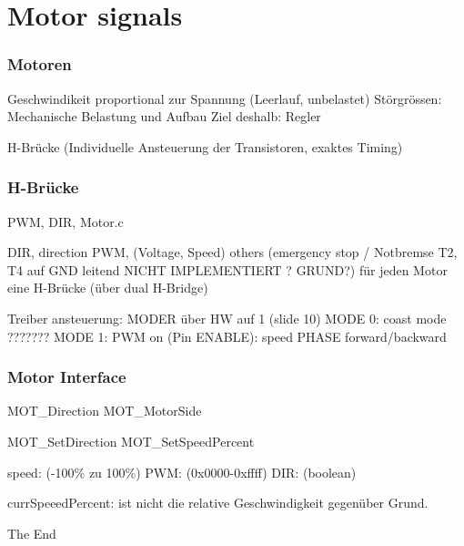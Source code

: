 \documentclass{beamer}
\begin{document}
\section{Motor signals} %
\begin{frame}
	\frametitle{Motoren}
	Geschwindikeit proportional zur Spannung (Leerlauf, unbelastet)
		Störgrössen: Mechanische Belastung und Aufbau
	Ziel deshalb: Regler

	H-Brücke (Individuelle Ansteuerung der Transistoren, exaktes Timing)

	
\end{frame}

\begin{frame}
	\frametitle{H-Brücke}
	PWM, DIR, Motor.c

	DIR, direction
	PWM, (Voltage, Speed)
	others (emergency stop / Notbremse T2, T4 auf GND leitend NICHT IMPLEMENTIERT ? GRUND?)
	für jeden Motor eine H-Brücke (über dual H-Bridge)

	Treiber ansteuerung:
		MODER über HW auf 1 (slide 10)
		MODE 0: coast mode ???????
		MODE 1:
			PWM on (Pin ENABLE): speed
			PHASE forward/backward


\end{frame}

\begin{frame}
		\frametitle{Motor Interface}
		MOT\_Direction
		MOT\_MotorSide

		MOT\_SetDirection
		MOT\_SetSpeedPercent

		speed: (-100\% zu 100\%)
		PWM: (0x0000-0xffff)
		DIR: (boolean)

		currSpeeedPercent: ist nicht die relative Geschwindigkeit gegenüber Grund.

\end{frame}
\begin{frame}
\Huge{\centerline{The End}}
\end{frame}
\end{document}
